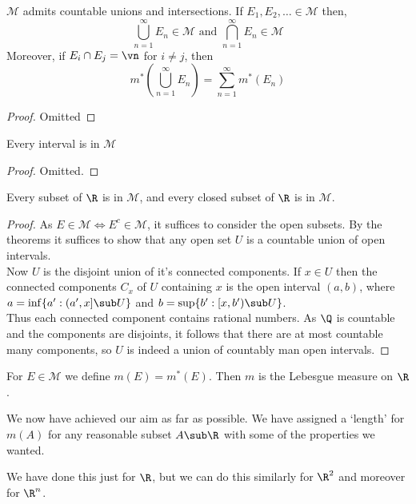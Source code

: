 \begin{nthm}[]
  $\mathcal{M}$ admits countable unions and intersections. If $E_1, E_2, \dots \in \mathcal{M}$ then,
  $$ \bigcup_{n=1}^\infty E_n \in \mathcal{M} \text{ and } \bigcap_{n=1}^\infty E_n \in \mathcal{M} $$
  \noindent
  Moreover, if $E_i \cap E_j = \vn$ for $i \ne j$, then
  $$ m^*\left( \bigcup_{n=1}^\infty E_n \right) = \sum_{n=1}^\infty m^*(E_n)$$
\end{nthm}
\begin{proof}
  Omitted
\end{proof}

\begin{nthm}[]
  Every interval is in $\mathcal{M}$
\end{nthm}
\begin{proof}
  Omitted.
\end{proof}
\begin{ncor}
   Every subset of $\R$ is in $\mathcal{M}$, and every closed subset of $\R$ is in $\mathcal{M}$.
\end{ncor}
\begin{proof}
  As $E \in \mathcal{M} \iff E^c \in \mathcal{M}$, it suffices to consider the open subsets. By the theorems it suffices to show that any open set $U$ is a countable union of open intervals.\\

  \noindent
  Now $U$ is the disjoint union of it's connected components. If $x \in U$ then the connected components $C_x$ of $U$ containing $x$ is the open interval $(a, b)$, where $a = \inf \{a' : (a', x] \sub U\}$ and $b = \sup \{b' : [x, b') \sub U\}$.\\

  \noindent
  Thus each connected component contains rational numbers. As $\Q$ is countable and the components are disjoints, it follows that there are at most countable many components, so $U$ is indeed a union of countably man open intervals.
\end{proof}

\begin{ndefi}[Lebesgue]
  For $E\in \mathcal{M}$ we define $m(E) = m^*(E)$. Then $m$ is the Lebesgue measure on $\R$.
\end{ndefi}

\noindent
We now have achieved our aim as far as possible. We have assigned a `length' for $m(A)$ for any reasonable subset $A \sub \R$ with some of the properties we wanted.

\begin{remark}
   We have done this just for $\R$, but we can do this similarly for $\R^2$ and moreover for $\R^n$.
\end{remark}

